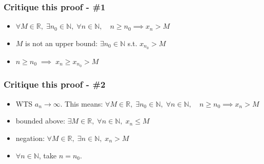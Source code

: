 \documentclass[14pt]{beamer}
\begin{document}
\begin{frame}[t]
	\fontsize{13}{13}\selectfont
	\frametitle{Critique this proof - \#1}

	\begin{itemize}
		\vfill

		\item $\displaystyle \forall M \in \mathbb{R}, \; \exists n_{0}\in \mathbb{N}
			, \; \forall n \in \mathbb{N}, \quad n\geq n_{0}\implies x_{n}> M$
			\vfill
			\vfill

		\item $M$ is not an upper bound: $\displaystyle \exists n_{0}\in \mathbb{N}$
			s.t. $\displaystyle x_{n_0}> M$
			\vfill
			\vfill

		\item $\displaystyle n \geq n_{0}\; \implies \; x_{n}\geq x_{n_0}> M$
			\vfill
	\end{itemize}
\end{frame}

\begin{frame}[t]
	\fontsize{13}{13}\selectfont
	\frametitle{Critique this proof - \#2}

	\begin{itemize}
		\vfill

		\item WTS $a_{n}\rightarrow \infty$. This means:
			\vspace{.2cm}
			\quad $\displaystyle \forall M \in \mathbb{R}, \; \exists n_{0}\in \mathbb{N}
			, \; \forall n \in \mathbb{N}, \quad n\geq n_{0}\implies x_{n}> M$
			\vfill
			\vfill

		\item bounded above: \quad
			$\displaystyle \exists M \in \mathbb{R}, \; \forall n \in \mathbb{N}, \; x_{n}
			\leq M$
			\vfill
			\vfill

		\item negation: \quad
			$\displaystyle \forall M \in \mathbb{R}, \; \exists n \in \mathbb{N}, \; x_{n}
			> M$
			\vfill
			\vfill

		\item $\forall n \in \mathbb{N}$, take $n=n_{0}$.
			\vfill
	\end{itemize}
\end{frame}
\end{document}
